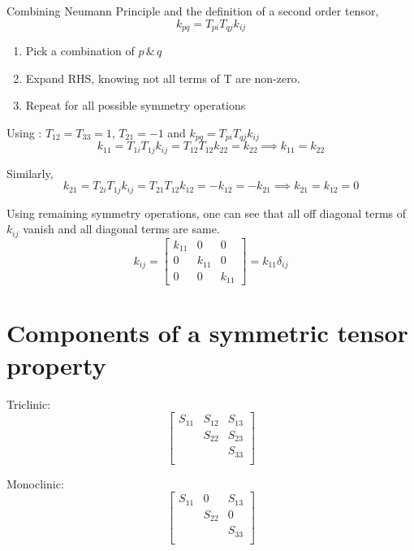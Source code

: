 Combining Neumann Principle and the definition of a second order tensor,
$$ k_{pq} = T_{pi} T_{qj} k_{ij} $$
\begin{enumerate}
\item Pick a combination of $p \, \& \, q$
\item Expand RHS, knowing not all terms of T are non-zero.
\item Repeat for all possible symmetry operations
\end{enumerate}


Using : $T_{12} = T_{33} = 1$, $T_{21}=-1$ and $ k_{pq} = T_{pi} T_{qj} k_{ij} $
$$k_{11} = T_{1i}T_{1j}k_{ij} = T_{12} T_{12} k_{22} = k_{22} \implies k_{11} = k_{22}$$

Similarly,
$$k_{21} = T_{2i} T_{1j} k_{ij} = T_{21} T_{12} k_{12} = -k_{12} = -k_{21} \implies k_{21} = k_{12} = 0$$

Using remaining symmetry operations, one can see that all off diagonal terms of $k_{ij}$ vanish and all diagonal terms are same.
\begin{equation*}
k_{ij} = \left[
\begin{array}{lll}
k_{11} & 0 & 0 \\
0 & k_{11} & 0 \\
0 & 0 & k_{11}
\end{array}
\right] = k_{11} \delta_{ij}
\end{equation*}



\section{Components of a symmetric tensor property}

Triclinic:
\begin{equation*}
\left[
\begin{array}{lll}
S_{11} & S_{12} & S_{13} \\
 & S_{22} & S_{23} \\
 &  & S_{33} \\
\end{array}
\right]
\end{equation*}

Monoclinic:
\begin{equation*}
\left[
\begin{array}{lll}
S_{11} & 0 & S_{13} \\
 & S_{22} & 0 \\
 &  & S_{33} \\
\end{array}
\right]
\end{equation*}

